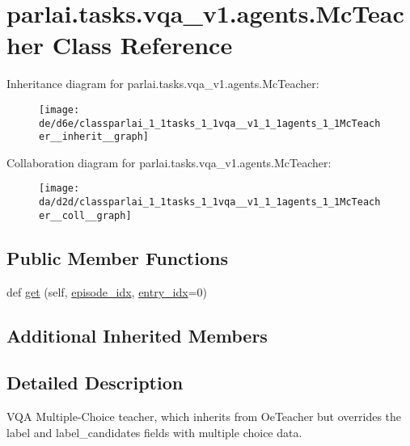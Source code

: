 \hypertarget{classparlai_1_1tasks_1_1vqa__v1_1_1agents_1_1McTeacher}{}\section{parlai.\+tasks.\+vqa\+\_\+v1.\+agents.\+Mc\+Teacher Class Reference}
\label{classparlai_1_1tasks_1_1vqa__v1_1_1agents_1_1McTeacher}


Inheritance diagram for parlai.\+tasks.\+vqa\+\_\+v1.\+agents.\+Mc\+Teacher\+:
\nopagebreak
\begin{figure}[H]
\begin{center}
\leavevmode
\texttt{[image: de/d6e/classparlai\_1\_1tasks\_1\_1vqa\_\_v1\_1\_1agents\_1\_1McTeacher\_\_inherit\_\_graph]}
\end{center}
\end{figure}


Collaboration diagram for parlai.\+tasks.\+vqa\+\_\+v1.\+agents.\+Mc\+Teacher\+:
\nopagebreak
\begin{figure}[H]
\begin{center}
\leavevmode
\texttt{[image: da/d2d/classparlai\_1\_1tasks\_1\_1vqa\_\_v1\_1\_1agents\_1\_1McTeacher\_\_coll\_\_graph]}
\end{center}
\end{figure}
\subsection*{Public Member Functions}
\begin{DoxyCompactItemize}
\item 
def \hyperlink{classparlai_1_1tasks_1_1vqa__v1_1_1agents_1_1McTeacher_acfe24f89d048cb6e8ccd745838223f07}{get} (self, \hyperlink{classparlai_1_1core_1_1teachers_1_1FixedDialogTeacher_afd4ebab8063eb42d182d30a1a41f133e}{episode\+\_\+idx}, \hyperlink{classparlai_1_1core_1_1teachers_1_1FixedDialogTeacher_ae3201b15f3c3b46a2f3511bad9b43e7d}{entry\+\_\+idx}=0)
\end{DoxyCompactItemize}
\subsection*{Additional Inherited Members}


\subsection{Detailed Description}
\begin{DoxyVerb}VQA Multiple-Choice teacher, which inherits from OeTeacher but overrides the label
and label_candidates fields with multiple choice data.
\end{DoxyVerb}
 

